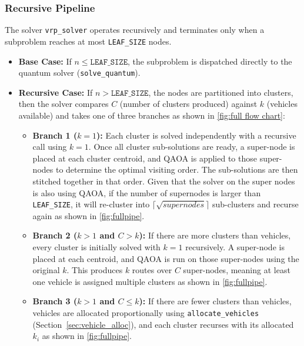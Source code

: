 \documentclass[a4paper]{report}
\begin{document}
{\begin{itemize}
\subsubsection{Recursive Pipeline}

The solver \texttt{vrp\_solver} operates recursively and terminates only when a subproblem reaches at most \texttt{LEAF\_SIZE} nodes. 
\begin{itemize}
    \item \textbf{Base Case:} If $n \leq \texttt{LEAF\_SIZE} $, the subproblem is dispatched directly to the quantum solver (\texttt{solve\_quantum}). 

\item\textbf{Recursive Case:} If $n > \texttt{LEAF\_SIZE}$, the nodes are partitioned into clusters, then the solver compares $C$ (number of clusters produced) against $k$ (vehicles available) and takes one of three branches as shown in \ref{fig:full flow chart}:

\begin{itemize}
    \item \textbf{Branch 1 ($k=1$):} Each cluster is solved independently with a recursive call using $k=1$. Once all cluster sub-solutions are ready, a super-node is placed at each cluster centroid, and QAOA is applied to those super-nodes to determine the optimal visiting order. The sub-solutions are then stitched together in that order. Given that the solver on the super nodes is also using QAOA, if the number of supernodes is larger than \texttt{LEAF\_SIZE}, it will re-cluster into $\lceil\sqrt{supernodes}\rceil $ sub-clusters and recurse again as shown in \ref{fig:fullpipe}.
  
    \item \textbf{Branch 2 ($k > 1$ and $C > k$):} If there are more clusters than vehicles, every cluster is initially solved with $k=1$ recursively. A super-node is placed at each centroid, and QAOA is run on those super-nodes using the original $k$. This produces $k$ routes over $C$ super-nodes, meaning at least one vehicle is assigned multiple clusters as shown in \ref{fig:fullpipe}.
    
    \item \textbf{Branch 3 ($k > 1$ and $C \leq k$):} If there are fewer clusters than vehicles, vehicles are allocated proportionally using \texttt{allocate\_vehicles} (Section~\ref{sec:vehicle_alloc}), and each cluster recurses with its allocated $k_i$ as shown in \ref{fig:fullpipe}.
\end{itemize}
\end{itemize}


\end{itemize}}
\end{document}
